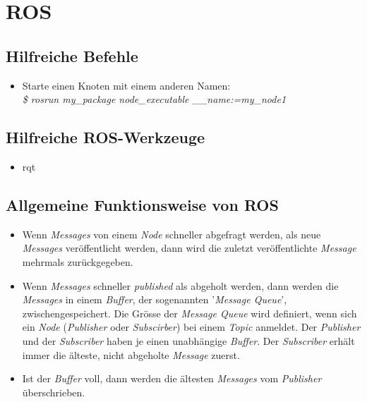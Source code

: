 \chapter{ROS}


\section{Hilfreiche Befehle}

\begin{itemize}
\item Starte einen Knoten mit einem anderen Namen: \\
\textit{\$ rosrun my\_package node\_executable \_\_name:=my\_node1}
\end{itemize}


\section{Hilfreiche ROS-Werkzeuge}

\begin{itemize}
\item rqt
\end{itemize}


\section{Allgemeine Funktionsweise von ROS}

\begin{itemize}
\item Wenn \textit{Messages} von einem \textit{Node} schneller abgefragt werden, als neue \textit{Messages} veröffentlicht werden, dann wird die zuletzt veröffentlichte \textit{Message} mehrmals zurückgegeben.
\item Wenn \textit{Messages} schneller \textit{published} als abgeholt werden, dann werden die \textit{Messages} in einem \textit{Buffer}, der sogenannten '\textit{Message Queue}', zwischengespeichert. Die Grösse der \textit{Message Queue} wird definiert, wenn sich ein \textit{Node} (\textit{Publisher} oder \textit{Subscirber}) bei einem \textit{Topic} anmeldet. Der \textit{Publisher} und der \textit{Subscriber} haben je einen unabhängige \textit{Buffer}. Der \textit{Subscriber} erhält immer die älteste, nicht abgeholte \textit{Message} zuerst.
\item Ist der \textit{Buffer} voll, dann werden die ältesten \textit{Messages} vom \textit{Publisher} überschrieben.
\end{itemize}


